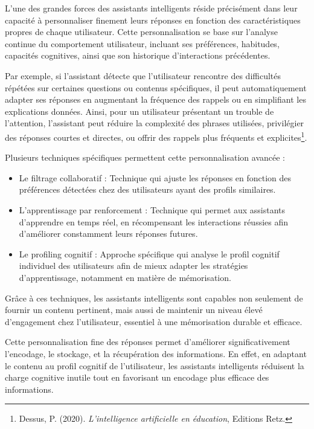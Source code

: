 \documentclass[11pt,a4paper]{report}
\begin{document}
L’une des grandes forces des assistants intelligents réside précisément dans leur capacité à personnaliser finement leurs réponses en fonction des caractéristiques propres de chaque utilisateur. Cette personnalisation se base sur l’analyse continue du comportement utilisateur, incluant ses préférences, habitudes, capacités cognitives, ainsi que son historique d’interactions précédentes.

Par exemple, si l'assistant détecte que l'utilisateur rencontre des difficultés répétées sur certaines questions ou contenus spécifiques, il peut automatiquement adapter ses réponses en augmentant la fréquence des rappels ou en simplifiant les explications données. Ainsi, pour un utilisateur présentant un trouble de l’attention, l’assistant peut réduire la complexité des phrases utilisées, privilégier des réponses courtes et directes, ou offrir des rappels plus fréquents et explicites\footnote{Dessus, P. (2020). \textit{L’intelligence artificielle en éducation}, Editions Retz.}.

Plusieurs techniques spécifiques permettent cette personnalisation avancée :
\begin{itemize}

    \item Le filtrage collaboratif : Technique qui ajuste les réponses en fonction des préférences détectées chez des utilisateurs ayant des profils similaires.
    
    \item L’apprentissage par renforcement : Technique qui permet aux assistants d’apprendre en temps réel, en récompensant les interactions réussies afin d'améliorer constamment leurs réponses futures.
    
    \item Le profiling cognitif : Approche spécifique qui analyse le profil cognitif individuel des utilisateurs afin de mieux adapter les stratégies d’apprentissage, notamment en matière de mémorisation.
    
\end{itemize}

Grâce à ces techniques, les assistants intelligents sont capables non seulement de fournir un contenu pertinent, mais aussi de maintenir un niveau élevé d’engagement chez l’utilisateur, essentiel à une mémorisation durable et efficace.

Cette personnalisation fine des réponses permet d'améliorer significativement l’encodage, le stockage, et la récupération des informations. En effet, en adaptant le contenu au profil cognitif de l'utilisateur, les assistants intelligents réduisent la charge cognitive inutile tout en favorisant un encodage plus efficace des informations.
\end{document}
